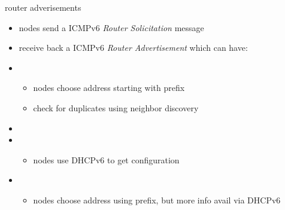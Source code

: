 \begin{frame}{router adverisements}
\begin{itemize}
\item nodes send a ICMPv6 \textit{Router Solicitation} message
\item receive back a ICMPv6 \textit{Router Advertisement} which can have:
\vspace{.5cm}
\item {}
    \begin{itemize}
    \item nodes choose address starting with prefix
    \item check for duplicates using neighbor discovery
    \end{itemize}
\item {}
\item {}
    \begin{itemize}
    \item nodes use DHCPv6 to get configuration
    \end{itemize}
\item {}
    \begin{itemize}
    \item nodes choose address using prefix, but more info avail via DHCPv6
    \end{itemize}
\end{itemize}
\end{frame}
